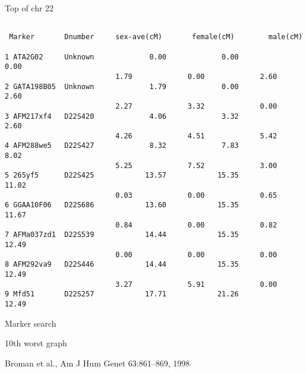 \documentclass[aspectratio=169,12pt,t]{beamer}
\begin{document}
\begin{frame}[fragile]{Top of chr 22}

\begin{center}

{\fontsize{8pt}{9.5}\selectfont

\begin{verbatim}

 Marker       Dnumber     sex-ave(cM)       female(cM)        male(cM)

1 ATA2G02     Unknown             0.00             0.00             0.00
                          1.79             0.00             2.60
2 GATA198B05  Unknown             1.79             0.00             2.60
                          2.27             3.32             0.00
3 AFM217xf4   D22S420             4.06             3.32             2.60
                          4.26             4.51             5.42
4 AFM288we5   D22S427             8.32             7.83             8.02
                          5.25             7.52             3.00
5 265yf5      D22S425            13.57            15.35            11.02
                          0.03             0.00             0.65
6 GGAA10F06   D22S686            13.60            15.35            11.67
                          0.84             0.00             0.82
7 AFMa037zd1  D22S539            14.44            15.35            12.49
                          0.00             0.00             0.00
8 AFM292va9   D22S446            14.44            15.35            12.49
                          3.27             5.91             0.00
9 Mfd51       D22S257            17.71            21.26            12.49
\end{verbatim}

}
\end{center}
\end{frame}


\begin{frame}[c]{Marker search}



\end{frame}






\begin{frame}{10th worst graph}



\vspace{0mm}

\hfill {\scriptsize \lolit
Broman et al., Am J Hum Genet 63:861--869, 1998}

\end{frame}
\end{document}
